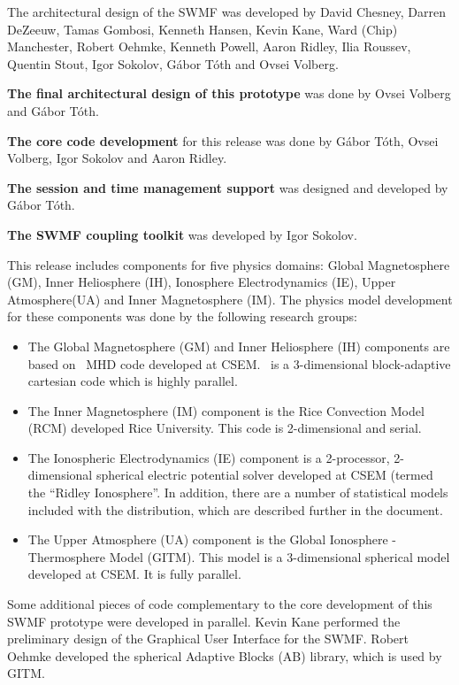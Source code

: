 The architectural design of the SWMF was developed by David Chesney,
Darren DeZeeuw, Tamas Gombosi, Kenneth Hansen, Kevin Kane, Ward (Chip)
Manchester, Robert Oehmke, Kenneth Powell, Aaron Ridley, Ilia Roussev,
Quentin Stout, Igor Sokolov, G\'abor T\'oth and Ovsei Volberg.

{\bf The final architectural design of this prototype} was done by
Ovsei Volberg and G\'abor T\'oth.

{\bf The core code development} for this release was done by G\'abor
T\'oth, Ovsei Volberg, Igor Sokolov and Aaron Ridley.

{\bf The session and time management support} was designed and
developed by G\'abor T\'oth.

{\bf The SWMF coupling toolkit} was developed by Igor Sokolov.

This release includes components for five physics domains: Global
Magnetosphere (GM), Inner Heliosphere (IH), Ionosphere Electrodynamics
(IE), Upper Atmosphere(UA) and Inner Magnetosphere (IM).  The physics
model development for these components was done by the following
research groups:

\begin{itemize}
\item
The Global Magnetosphere (GM) and Inner Heliosphere (IH) components
are based on \BATSRUS\ MHD code developed at CSEM. \BATSRUS\ is a
3-dimensional block-adaptive cartesian code which is highly parallel.

\item
The Inner Magnetosphere (IM) component is the Rice Convection Model
(RCM) developed Rice University.  This code is 2-dimensional and
serial.

\item
The Ionospheric Electrodynamics (IE) component is a 2-processor,
2-dimensional spherical electric potential solver developed at CSEM
(termed the ``Ridley Ionosphere''.  In addition, there are a number of
statistical models included with the distribution, which are described
further in the document.

\item
The Upper Atmosphere (UA) component is the Global Ionosphere -
Thermosphere Model (GITM).  This model is a 3-dimensional spherical
model developed at CSEM.  It is fully parallel.

\end{itemize}

Some additional pieces of code complementary to the core development
of this SWMF prototype were developed in parallel.  Kevin Kane
performed the preliminary design of the Graphical User Interface for
the SWMF.  Robert Oehmke developed the spherical Adaptive Blocks (AB)
library, which is used by GITM.

